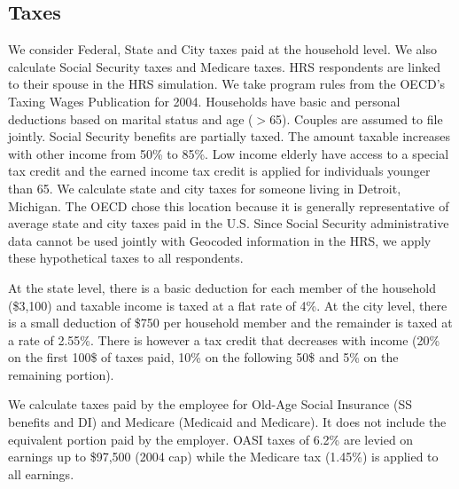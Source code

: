 \subsection{Taxes}
We consider Federal, State and City taxes paid at the household level. We also calculate Social Security taxes and Medicare taxes. HRS 
respondents are linked to their spouse in the HRS simulation. We take program rules from the OECD's Taxing Wages Publication for 2004. 
Households have basic and personal deductions based on marital status and age ($>$65). Couples are assumed to file jointly. Social Security 
benefits are partially taxed. The amount taxable increases with other income from 50\% to 85\%. Low income elderly have access to a special 
tax credit and the earned income tax credit is applied for individuals younger than 65. We calculate state and city taxes for someone 
living in Detroit, Michigan. The OECD chose this location because it is generally representative of average state and city taxes paid in 
the U.S. Since Social Security administrative data cannot be used jointly with Geocoded information in the HRS, we apply these hypothetical 
taxes to all respondents.

At the state level, there is a basic deduction for each member of the household (\$3,100) and taxable income is taxed at a flat rate of 4\%. 
At the city level, there is a small deduction of \$750 per household member and the remainder is taxed at a rate of 2.55\%. There is however 
a tax credit that decreases with income (20\% on the first 100\$ of taxes paid, 10\% on the following 50\$ and 5\% on the remaining portion). 

We calculate taxes paid by the employee for Old-Age Social Insurance (SS benefits and DI) and Medicare (Medicaid and Medicare). It does not 
include the equivalent portion paid by the employer. OASI taxes of 6.2\% are levied on earnings up to \$97,500 (2004 cap) while the Medicare 
tax (1.45\%) is applied to all earnings.

